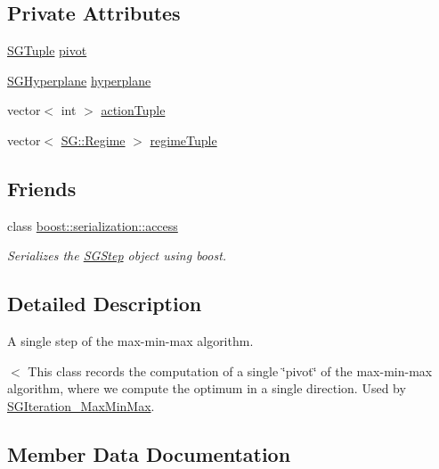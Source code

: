 \subsection*{Private Attributes}
\begin{DoxyCompactItemize}
\item 
\hyperlink{classSGTuple}{S\+G\+Tuple} \hyperlink{classSGStep_adb0e98277220bdb428de1a6725f6ddd0}{pivot}
\item 
\hyperlink{classSGHyperplane}{S\+G\+Hyperplane} \hyperlink{classSGStep_a72d5305fa558c5ef32118f83a6000e06}{hyperplane}
\item 
vector$<$ int $>$ \hyperlink{classSGStep_a227186eed93364254969bb15e7ae0e18}{action\+Tuple}
\item 
vector$<$ \hyperlink{namespaceSG_a139e4dec41ea0f38aae1f93f60cfff60}{S\+G\+::\+Regime} $>$ \hyperlink{classSGStep_ad17acaa7ac465c64b18c3a74fbf07d92}{regime\+Tuple}
\end{DoxyCompactItemize}
\subsection*{Friends}
\begin{DoxyCompactItemize}
\item 
\mbox{\label{classSGStep_ac98d07dd8f7b70e16ccb9a01abf56b9c}} 
class \hyperlink{classSGStep_ac98d07dd8f7b70e16ccb9a01abf56b9c}{boost\+::serialization\+::access}
\begin{DoxyCompactList}\small\item\em Serializes the \hyperlink{classSGStep}{S\+G\+Step} object using boost. \end{DoxyCompactList}\end{DoxyCompactItemize}


\subsection{Detailed Description}
A single step of the max-\/min-\/max algorithm. 

$<$ This class records the computation of a single \char`\"{}pivot\char`\"{} of the max-\/min-\/max algorithm, where we compute the optimum in a single direction. Used by \hyperlink{classSGIteration__MaxMinMax}{S\+G\+Iteration\+\_\+\+Max\+Min\+Max}. 

\subsection{Member Data Documentation}
\mbox{\label{classSGStep_a227186eed93364254969bb15e7ae0e18}} 
